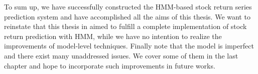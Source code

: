 To sum up,
we have successfully constructed the HMM-based stock return series prediction system
and have accomplished all the aims of this thesis.
We want to reinstate that this thesis in aimed to fulfill a complete implementation
of stock return prediction with HMM,
while we have no intention to realize the improvements of model-level techniques.
Finally note that the model is imperfect and there exist many unaddressed issues.
We cover some of them in the last chapter and hope to incorporate such improvements in future works.